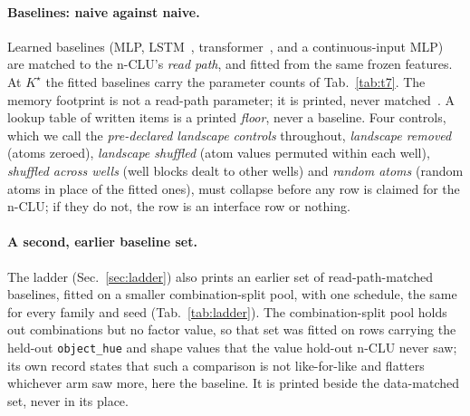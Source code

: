 \documentclass{article} %
\newcommand{\Kstar}{\ensuremath{K^{\star}}}
\begin{document}
\paragraph{Baselines: naive against naive.} Learned baselines (MLP, LSTM~\citep{hochreiter_long_1997}, transformer~\citep{vaswani_attention_2023}, and a
continuous-input MLP) are matched to the n-CLU's \emph{read path}, and fitted from the same
frozen features. At $\Kstar$ the fitted baselines carry the parameter counts of Tab.~\ref{tab:t7}.
The memory footprint is not a read-path parameter; it is printed, never matched~\citep{borgeaud_improving_2022,khandelwal_generalization_2020,lample_large_2019}. A lookup table
of written items is a printed \emph{floor}, never a baseline. Four controls, which we call the \emph{pre-declared
landscape controls} throughout, \emph{landscape removed} (atoms zeroed), \emph{landscape shuffled} (atom values permuted within each well), \emph{shuffled across wells}
(well blocks dealt to other wells) and \emph{random atoms} (random atoms in place of the fitted ones), must collapse before any
row is claimed for the n-CLU; if they do not, the row is an interface row or nothing.

\paragraph{A second, earlier baseline set.} The ladder (Sec.~\ref{sec:ladder}) also prints an earlier set
of read-path-matched baselines, fitted on a smaller combination-split pool, %
with one schedule, the same for %
every family and seed (Tab.~\ref{tab:ladder}). %
The combination-split pool holds out combinations but no factor value, so that set was fitted on
rows carrying the held-out \texttt{object\_hue} and shape values that the value hold-out n-CLU never
saw; its own record states that such a comparison is not like-for-like and flatters whichever arm
saw more, here the baseline. It is printed beside the data-matched set, never in its place.
\end{document}
